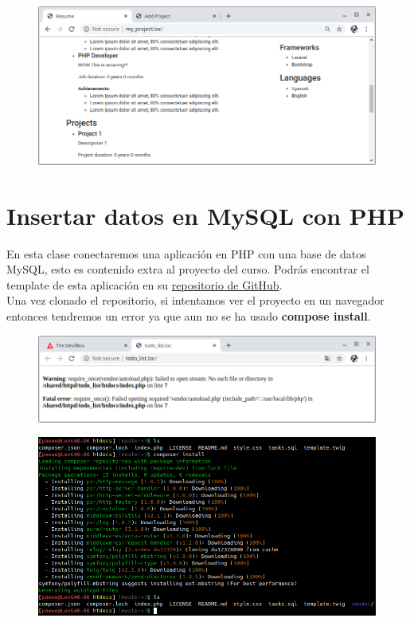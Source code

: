 \documentclass{article}
\begin{document}
\begin{figure}[h!]
  \centering
  \includegraphics[scale=0.5]{./Pictures/097_projects_success.png}
\end{figure}


\section{Insertar datos en MySQL con PHP}%
En esta clase conectaremos una aplicación en PHP con una base de datos MySQL,
esto es contenido extra al proyecto del curso. Podrás encontrar el template de
esta aplicación en su
\href{https://github.com/hectorbenitez/php-database-crud}{repositorio de
GitHub}.\\

Una vez clonado el repositorio, si intentamos ver el proyecto en un navegador
entonces tendremos un error ya que aun no se ha usado \textbf{compose
install}.\\

\begin{figure}[h!]
  \centering
  \includegraphics[scale=0.5]{./Pictures/098_todolisterror.png}
\end{figure}

\begin{figure}[h!]
  \centering
  \includegraphics[scale=0.75]{./Pictures/099_composerIntall.png}
\end{figure}
\end{document}
